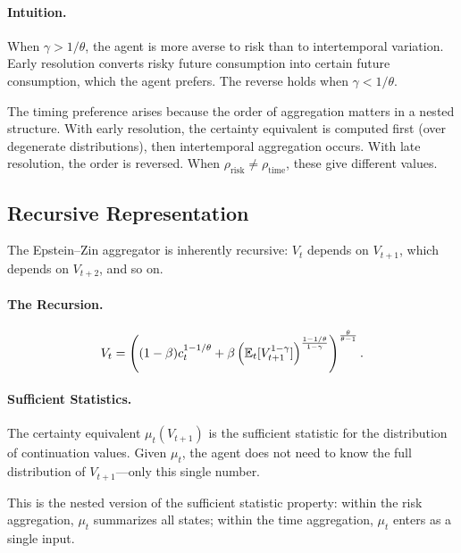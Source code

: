 \paragraph{Intuition.}
When $\gamma > 1/\theta$, the agent is more averse to risk than to intertemporal variation. Early resolution converts risky future consumption into certain future consumption, which the agent prefers. The reverse holds when $\gamma < 1/\theta$.

\begin{calloutnote}
The timing preference arises because the order of aggregation matters in a nested structure. With early resolution, the certainty equivalent is computed first (over degenerate distributions), then intertemporal aggregation occurs. With late resolution, the order is reversed. When $\rho_{\text{risk}} \neq \rho_{\text{time}}$, these give different values.
\end{calloutnote}

\subsection{Recursive Representation}
\label{subsec:ez-recursive}

The Epstein--Zin aggregator is inherently recursive: $V_t$ depends on $V_{t+1}$, which depends on $V_{t+2}$, and so on.

\paragraph{The Recursion.}
\begin{equation}
V_t = \left( (1-\beta) c_t^{1-1/\theta} + \beta \left( \mathbb{E}_t[V_{t+1}^{1-\gamma}] \right)^{\frac{1-1/\theta}{1-\gamma}} \right)^{\frac{\theta}{\theta-1}}.
\label{eq:ez-recursion}
\end{equation}

\paragraph{Sufficient Statistics.}
The certainty equivalent $\mu_t(V_{t+1})$ is the sufficient statistic for the distribution of continuation values. Given $\mu_t$, the agent does not need to know the full distribution of $V_{t+1}$---only this single number.

This is the nested version of the sufficient statistic property: within the risk aggregation, $\mu_t$ summarizes all states; within the time aggregation, $\mu_t$ enters as a single input.

